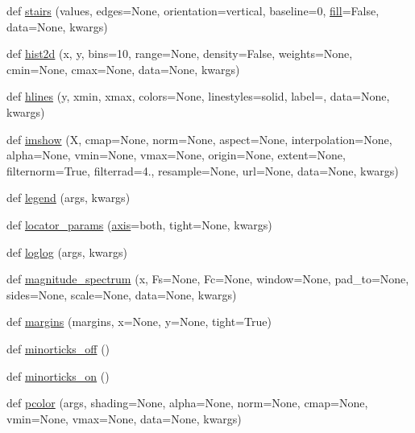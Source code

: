 \begin{DoxyCompactItemize}
\item 
def \hyperlink{namespacematplotlib_1_1pyplot_a32afbd47945f2253e11f54eb9a539cb1}{stairs} (values, edges=None, orientation=\textquotesingle{}vertical\textquotesingle{}, baseline=0, \hyperlink{namespacematplotlib_1_1pyplot_a75e31f548b55de2ff4b4fb303d16fbc6}{fill}=False, data=None, kwargs)
\item 
def \hyperlink{namespacematplotlib_1_1pyplot_a60fc925466142197bc8535d99dd03c93}{hist2d} (x, y, bins=10, range=None, density=False, weights=None, cmin=None, cmax=None, data=None, kwargs)
\item 
def \hyperlink{namespacematplotlib_1_1pyplot_a907349be40e3da802bd57964572d2c8a}{hlines} (y, xmin, xmax, colors=None, linestyles=\textquotesingle{}solid\textquotesingle{}, label=\textquotesingle{}\textquotesingle{}, data=None, kwargs)
\item 
def \hyperlink{namespacematplotlib_1_1pyplot_aaf8c14f71ad1900a1e13053d163e9138}{imshow} (X, cmap=None, norm=None, aspect=None, interpolation=None, alpha=None, vmin=None, vmax=None, origin=None, extent=None, filternorm=True, filterrad=4., resample=None, url=None, data=None, kwargs)
\item 
def \hyperlink{namespacematplotlib_1_1pyplot_a204a6959ab33c681d90bc2dfcb721de9}{legend} (args, kwargs)
\item 
def \hyperlink{namespacematplotlib_1_1pyplot_a2368e0ea8aa716903a4337709b3382ac}{locator\+\_\+params} (\hyperlink{namespacematplotlib_1_1pyplot_a491a6aa585ceb1955264031156654647}{axis}=\textquotesingle{}both\textquotesingle{}, tight=None, kwargs)
\item 
def \hyperlink{namespacematplotlib_1_1pyplot_a2b1e11250f5ac70ab8d4e07ca4aafaaf}{loglog} (args, kwargs)
\item 
def \hyperlink{namespacematplotlib_1_1pyplot_a14ca798e0cd54c7a5ad926cf260ea9d8}{magnitude\+\_\+spectrum} (x, Fs=None, Fc=None, window=None, pad\+\_\+to=None, sides=None, scale=None, data=None, kwargs)
\item 
def \hyperlink{namespacematplotlib_1_1pyplot_a6c1ce43e7e6dae38c570bfdb61390950}{margins} (margins, x=None, y=None, tight=True)
\item 
def \hyperlink{namespacematplotlib_1_1pyplot_a7d84148f3be369c4d9b014b567272754}{minorticks\+\_\+off} ()
\item 
def \hyperlink{namespacematplotlib_1_1pyplot_a69cc6aeacc07e8fcc8c45943d0593de5}{minorticks\+\_\+on} ()
\item 
def \hyperlink{namespacematplotlib_1_1pyplot_a3911268d9c0f5a5da39c7cd3fa04a2ef}{pcolor} (args, shading=None, alpha=None, norm=None, cmap=None, vmin=None, vmax=None, data=None, kwargs)

\end{DoxyCompactItemize}
